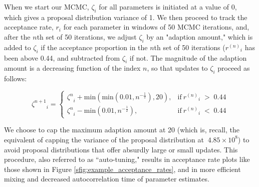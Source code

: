 \documentclass[12pt]{article}
\newcommand{\identifyadmixsource}[1]{{#1^{*}}}
\begin{document}
When we start our MCMC, $\zeta_i$ for all parameters is initiated at a value of 0, which gives a proposal distribution variance of 1.  We then proceed to track the acceptance rate, $r_i$ for each parameter in windows of 50 MCMC iterations, and, after the $n$th set of 50 iterations, we adjust $\zeta_i$ by an "adaption amount," which is added to $\zeta_i$ if the acceptance proportion in the $n$th set of 50 iterations (${r^{(n)}}_i$ has been above 0.44, and subtracted from $\zeta_i$ if not.  The magnitude of the adaption amount is a decreasing function of the index $n$, so that updates to $\zeta_i$ proceed as follows:

\begin{equation}
{\zeta^{n+1}}_i =
\begin{cases}
{\zeta^{n}}_i + \text{min}(\text{min}(0.01,n^{-\frac{1}{2}}),20), & \text{if} \: {r^{(n)}}_i \; > \; 0.44 \\
{\zeta^{n}}_i - \text{min}(0.01,n^{-\frac{1}{2}}), & \text{if} \: {r^{(n)}}_i \; < \; 0.44
\end{cases}
\label{eq:adpative_mcmc}
\end{equation}

We choose to cap the maximum adaption amount at 20 (which is, recall, the equivalent of capping the variance of the proposal distribution at $~4.85 \times 10^8$) to avoid proposal distributions that offer absurdly large or small updates.  This procedure, also referred to as ``auto-tuning," results in acceptance rate plots like those shown in Figure \ref{sfig:example_acceptance_rates}, and in more efficient mixing and decreased autocorrelation time of parameter estimates.

\end{document}
